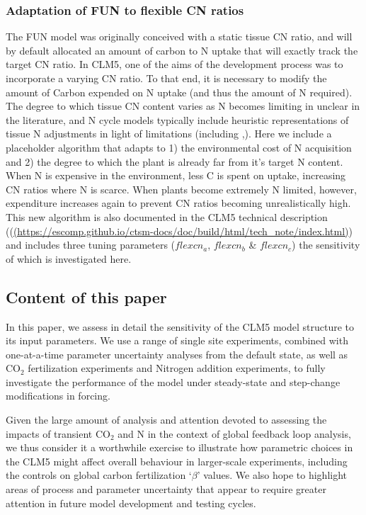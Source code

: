 \documentclass[draft,linenumbers]{agujournal}
\begin{document}
\subsubsection{Adaptation of FUN to flexible CN ratios}

The FUN model was originally conceived with a static tissue CN ratio, and will by default allocated an amount of carbon to N uptake that will exactly track the target CN ratio. In CLM5, one of the aims of the development process was to incorporate a varying CN ratio. To that end, it is necessary to modify the amount of Carbon expended on N uptake (and thus the amount of N required). The degree to which tissue CN content varies as N becomes limiting in unclear in the literature, and N cycle models typically include heuristic representations of tissue N adjustments in light of limitations (including \cite{zaehle2010},\cite{ghimire2016}). Here we include a placeholder algorithm that adapts to 1) the environmental cost of N acquisition and 2) the degree to which the plant is already far from it's target N content. When N is expensive in the environment, less C is spent on uptake, increasing CN ratios where N is scarce. When plants become extremely N limited, however, expenditure increases again to prevent CN ratios becoming unrealistically high. This new algorithm is also documented in the CLM5 technical description ((\url{(https://escomp.github.io/ctsm-docs/doc/build/html/tech_note/index.html)}) and includes three tuning parameters ($flexcn_{a}$, $flexcn_{b}$ \& $flexcn_{c}$) the sensitivity of which is investigated here.


\subsection{Content of this paper}

In this paper, we assess in detail the sensitivity of the CLM5 model structure to its input parameters. We use a range of single site experiments, combined with one-at-a-time parameter uncertainty analyses from the default state, as well as CO$_{2}$ fertilization experiments and Nitrogen addition experiments, 
to fully investigate the performance of the model under steady-state and step-change modifications in forcing.

Given the large amount of analysis and attention devoted to assessing the impacts of transient CO$_{2}$ and N in the context of global feedback loop analysis, we thus consider it a worthwhile exercise to illustrate how parametric choices in the CLM5 might affect overall behaviour in larger-scale experiments, including the controls on global carbon fertilization `$\beta$' values. We also hope to highlight areas of process and parameter uncertainty that appear to require greater attention in future model development and testing cycles. 
\end{document}
